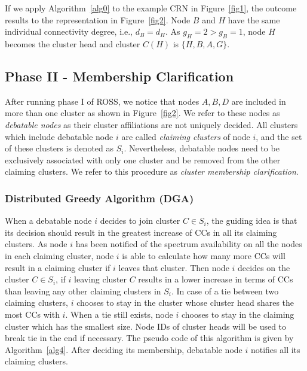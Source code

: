 \documentclass[times]{ettauth}
\theoremstyle{mytheoremstyle}
\theoremstyle{mytheoremstyle}
\theoremstyle{mytheoremstyle}
\begin{document}
If we apply Algorithm~\ref{alg0} to the example CRN in Figure~\ref{fig1}, the outcome results to the representation in Figure~\ref{fig2}.
Node $B$ and $H$ have the same individual connectivity degree, i.e., $d_B=d_H$. As $g_H=2>g_B=1$, node $H$ becomes the cluster head and cluster $C(H)$ is $\{H, B, A, G\}$.


\subsection{Phase II - Membership Clarification}
\label{membershipClarification}
After running phase I of ROSS, we notice that nodes $A, B, D$ are included in more than one cluster as shown in Figure~\ref{fig2}. 
We refer to these nodes as \textit{debatable nodes} as their cluster affiliations are not uniquely decided.
All clusters which include debatable node $i$ are called \textit{claiming clusters} of node $i$, and the set of these clusters is denoted as $S_i$.  
Nevertheless, debatable nodes need to be exclusively associated with only one cluster and be removed from the other claiming clusters.
We refer to this procedure as \textit{cluster membership clarification}.

\subsubsection{Distributed Greedy Algorithm (DGA)}
When a debatable node $i$ decides to join cluster $C\in S_i$, the guiding idea is that its decision should result in the greatest increase of CCs in all its claiming clusters.
As node $i$ has been notified of the spectrum availability on all the nodes in each claiming cluster, node $i$ is able to calculate how many more CCs will result in a claiming cluster if $i$ leaves that cluster.
Then node $i$ decides on the cluster $C\in S_i$, if $i$ leaving cluster $C$ results in a lower increase in terms of CCs than leaving any other claiming clusters in $S_i$.
In case of a tie between two claiming clusters, $i$ chooses to stay in the cluster whose cluster head shares the most CCs with $i$.
When a tie still exists, node $i$ chooses to stay in the claiming cluster which has the smallest size.
Node IDs of cluster heads will be used to break tie in the end if necessary.
The pseudo code of this algorithm is given by Algorithm~\ref{alg4}.
After deciding its membership, debatable node $i$ notifies all its claiming clusters.
\end{document}
